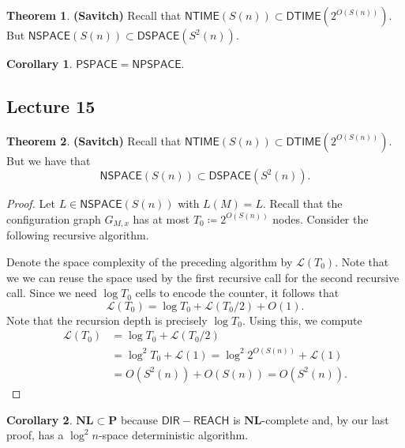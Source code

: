 \documentclass[10pt,letterpaper,cm]{nupset}
\theoremstyle{definition}
\newtheorem{theorem}{Theorem}
\newtheorem{corollary}{Corollary}
\newcommand{\1}{\mathbf{1}}
\newcommand{\0}{\vec 0}
\begin{document}
\begin{theorem}{\textbf{(Savitch)}}
Recall that $\mathsf{NTIME}(S(n)) \subset \mathsf{DTIME}(2^{O(S(n))})$. But $\mathsf{NSPACE}(S(n)) \subset \mathsf{DSPACE}(S^2(n))$.
\end{theorem}

\begin{corollary}
$\mathsf{PSPACE} = \mathsf{NPSPACE}$.
\end{corollary}

\subsection{Lecture 15}

\begin{theorem}{\textbf{(Savitch)}}
Recall that $\mathsf{NTIME}(S(n)) \subset \mathsf{DTIME}(2^{O(S(n))})$. But we have that $$\mathsf{NSPACE}(S(n)) \subset \mathsf{DSPACE}(S^2(n)).$$
\end{theorem}
\begin{proof}
Let $L \in \mathsf{NSPACE}(S(n)) $ with $L(M) = L$. Recall that the configuration graph $G_{M,x}$ has at most $T_0\coloneqq 2^{O(S(n))}$ nodes. Consider the following recursive algorithm.

\begin{algorithm}[H]
   {}
\end{algorithm}


Denote the space complexity of the preceding algorithm by $\mathcal{L}(T_0)$. Note that we we can reuse the space used by the first recursive call for the second recursive call. Since we need $\log{T_0}$ cells to encode the counter, it follows that
$$  \mathcal{L}(T_0) = \log{T_0} + \mathcal{L}(T_0/2) + O(1) .   $$   Note that the recursion depth is precisely $\log{T_0}$. Using this, we compute
\begin{align*}  \mathcal{L}(T_0)  & =    \log{T_0} + \mathcal{L}(T_0/2) 
\\ & = \log^2{T_0} + \mathcal{L}(1) =  \log^2{2^{O(S(n))}} + \mathcal{L}(1) 
\\ & = O(S^2(n)) + O(S(n)) = O(S^2(n))  .
\end{align*}
\end{proof}

\begin{corollary}
$\mathbf{NL} \subset \mathbf{P}$ because $\mathsf{DIR{-}REACH}$ is  $\mathbf{NL}$-complete and, by our last proof, has a $\log^2{n}$-space deterministic algorithm.
\end{corollary}
\end{document}
